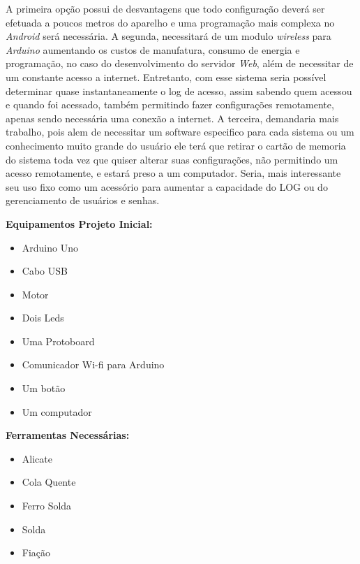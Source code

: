 \documentclass[12pt]{article}
\begin{document}
	A primeira opção possui de desvantagens que todo configuração deverá ser efetuada a poucos metros do aparelho e uma programação mais complexa no \textit{Android} será necessária.
A segunda, necessitará de um modulo \textit{wireless} para \textit{Arduino} aumentando os custos de manufatura, consumo de energia e programação, no caso do desenvolvimento do servidor \textit{Web}, além de necessitar de um constante acesso a internet. Entretanto, com esse sistema seria possível determinar quase instantaneamente  o log de acesso, assim sabendo quem acessou e quando foi acessado, também permitindo fazer configurações remotamente, apenas sendo necessária uma conexão a internet.
A terceira, demandaria mais trabalho, pois alem de necessitar um software especifico para cada sistema ou um conhecimento muito grande do usuário ele terá que retirar o cartão de memoria do sistema toda vez que quiser alterar suas configurações, não permitindo um acesso remotamente, e estará preso a um computador. Seria, mais interessante seu uso fixo como um acessório para aumentar a capacidade do LOG ou do gerenciamento de usuários e senhas. 

\newpage



\setlength{\columnseprule}{0pt}
\begin{multicols}{2}
\textbf{Equipamentos Projeto Inicial: }
\begin{itemize}
\item Arduino Uno 
\item Cabo USB 
\item Motor 
\item Dois Leds
\item Uma Protoboard
\item Comunicador Wi-fi para Arduino
\item Um botão
\item Um computador
\end{itemize}
\vfill


\textbf{Ferramentas Necessárias: }
\begin{itemize}
\item Alicate
\item Cola Quente
\item Ferro Solda
\item Solda
\item Fiação 
\end{itemize} 

\end{multicols}
\end{document}
